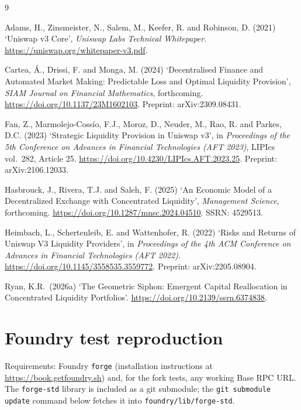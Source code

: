\documentclass[11pt,a4paper]{article}
\theoremstyle{definition}
\begin{document}
\begin{thebibliography}{9}

Adams, H., Zinsmeister, N., Salem, M., Keefer, R. and Robinson, D. (2021) `Uniswap v3 Core', \emph{Uniswap Labs Technical Whitepaper}. \url{https://uniswap.org/whitepaper-v3.pdf}.

Cartea, \'A., Drissi, F. and Monga, M. (2024) `Decentralised Finance and Automated Market Making: Predictable Loss and Optimal Liquidity Provision', \emph{SIAM Journal on Financial Mathematics}, forthcoming. \url{https://doi.org/10.1137/23M1602103}. Preprint: arXiv:2309.08431.

Fan, Z., Marmolejo-Cossío, F.J., Moroz, D., Neuder, M., Rao, R. and Parkes, D.C. (2023) `Strategic Liquidity Provision in Uniswap v3', in \emph{Proceedings of the 5th Conference on Advances in Financial Technologies (AFT 2023)}, LIPIcs vol.~282, Article 25. \url{https://doi.org/10.4230/LIPIcs.AFT.2023.25}. Preprint: arXiv:2106.12033.

Hasbrouck, J., Rivera, T.J. and Saleh, F. (2025) `An Economic Model of a Decentralized Exchange with Concentrated Liquidity', \emph{Management Science}, forthcoming. \url{https://doi.org/10.1287/mnsc.2024.04510}. SSRN: 4529513.

Heimbach, L., Schertenleib, E. and Wattenhofer, R. (2022) `Risks and Returns of Uniswap V3 Liquidity Providers', in \emph{Proceedings of the 4th ACM Conference on Advances in Financial Technologies (AFT 2022)}. \url{https://doi.org/10.1145/3558535.3559772}. Preprint: arXiv:2205.08904.

Ryan, K.R.\ (2026a) `The Geometric Siphon: Emergent Capital Reallocation in Concentrated Liquidity Portfolios'. \url{https://doi.org/10.2139/ssrn.6374838}.

\end{thebibliography}

\appendix
\newpage

\section{Foundry test reproduction}

Requirements: Foundry \texttt{forge} (installation instructions at \url{https://book.getfoundry.sh}) and, for the fork tests, any working Base RPC URL. The \texttt{forge-std} library is included as a git submodule; the \texttt{git submodule update} command below fetches it into \texttt{foundry/lib/forge-std}.
\end{document}
